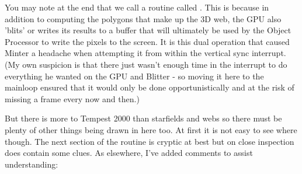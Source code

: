 You may note at the end that we call a routine called . This is because in addition to computing the
polygons that make up the 3D web, the GPU also 'blits' or writes its results to a buffer that will ultimately be used
by the Object Processor to write the pixels to the screen. It is this dual operation that caused Minter a headache
when attempting it from within the vertical sync interrupt. (My own suspicion is that there just wasn't enough time in the
interrupt to do everything he wanted on the GPU and Blitter - so moving it here to the mainloop ensured that it would only
be done opportunistically and at the risk of missing a frame every now and then.)

But there is more to Tempest 2000 than starfields and webs so there must be plenty of other things being drawn in here too.
At first it is not easy to see where though. The next section of the  routine is cryptic at best 
but on close inspection does contain some clues. As elsewhere, I've added comments to assist understanding:

